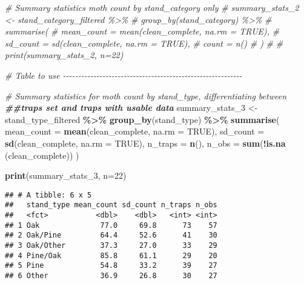 \documentclass[
]{article}
\newenvironment{Shaded}{\begin{snugshade}}{\end{snugshade}}
\newcommand{\AttributeTok}[1]{\textcolor[rgb]{0.13,0.29,0.53}{#1}}
\newcommand{\CommentTok}[1]{\textcolor[rgb]{0.56,0.35,0.01}{\textit{#1}}}
\newcommand{\ConstantTok}[1]{\textcolor[rgb]{0.56,0.35,0.01}{#1}}
\newcommand{\DecValTok}[1]{\textcolor[rgb]{0.00,0.00,0.81}{#1}}
\newcommand{\DocumentationTok}[1]{\textcolor[rgb]{0.56,0.35,0.01}{\textbf{\textit{#1}}}}
\newcommand{\FunctionTok}[1]{\textcolor[rgb]{0.13,0.29,0.53}{\textbf{#1}}}
\newcommand{\NormalTok}[1]{#1}
\newcommand{\OtherTok}[1]{\textcolor[rgb]{0.56,0.35,0.01}{#1}}
\newcommand{\SpecialCharTok}[1]{\textcolor[rgb]{0.81,0.36,0.00}{\textbf{#1}}}
\begin{document}
\begin{Shaded}
\begin{Highlighting}[]
\CommentTok{\# Summary statistics moth count by stand\_category only}
\CommentTok{\# summary\_stats\_2 \textless{}{-} stand\_category\_filtered \%\textgreater{}\%}
\CommentTok{\#   group\_by(stand\_category) \%\textgreater{}\%}
\CommentTok{\#   summarise(}
\CommentTok{\#     mean\_count = mean(clean\_complete, na.rm = TRUE),}
\CommentTok{\#     sd\_count = sd(clean\_complete, na.rm = TRUE),}
\CommentTok{\#     count = n()}
\CommentTok{\#   )}
\CommentTok{\# }
\CommentTok{\# print(summary\_stats\_2, n=22)}


\CommentTok{\# Table to use {-}{-}{-}{-}{-}{-}{-}{-}{-}{-}{-}{-}{-}{-}{-}{-}{-}{-}{-}{-}{-}{-}{-}{-}{-}{-}{-}{-}{-}{-}{-}{-}{-}{-}{-}{-}{-}{-}{-}{-}{-}{-}{-}{-}{-}{-}{-}{-}{-}{-}{-}{-}{-}{-}{-}{-}{-}{-}{-}}

\CommentTok{\# Summary statistics for moth count by stand\_type, differentiating between}
\DocumentationTok{\#\#traps set and traps with usable data}
\NormalTok{summary\_stats\_3 }\OtherTok{\textless{}{-}}\NormalTok{ stand\_type\_filtered }\SpecialCharTok{\%\textgreater{}\%}
  \FunctionTok{group\_by}\NormalTok{(stand\_type) }\SpecialCharTok{\%\textgreater{}\%}
  \FunctionTok{summarise}\NormalTok{(}
    \AttributeTok{mean\_count =} \FunctionTok{mean}\NormalTok{(clean\_complete, }\AttributeTok{na.rm =} \ConstantTok{TRUE}\NormalTok{),}
    \AttributeTok{sd\_count =} \FunctionTok{sd}\NormalTok{(clean\_complete, }\AttributeTok{na.rm =} \ConstantTok{TRUE}\NormalTok{),}
    \AttributeTok{n\_traps =} \FunctionTok{n}\NormalTok{(),}
    \AttributeTok{n\_obs =} \FunctionTok{sum}\NormalTok{(}\SpecialCharTok{!}\FunctionTok{is.na}\NormalTok{ (clean\_complete))}
\NormalTok{  )}

\FunctionTok{print}\NormalTok{(summary\_stats\_3, }\AttributeTok{n=}\DecValTok{22}\NormalTok{)}
\end{Highlighting}
\end{Shaded}

\begin{verbatim}
## # A tibble: 6 x 5
##   stand_type mean_count sd_count n_traps n_obs
##   <fct>           <dbl>    <dbl>   <int> <int>
## 1 Oak              77.0     69.8      73    57
## 2 Oak/Pine         64.4     52.6      41    30
## 3 Oak/Other        37.3     27.0      33    29
## 4 Pine/Oak         85.8     61.1      29    20
## 5 Pine             54.8     33.2      39    27
## 6 Other            36.9     26.8      30    27
\end{verbatim}
\end{document}
